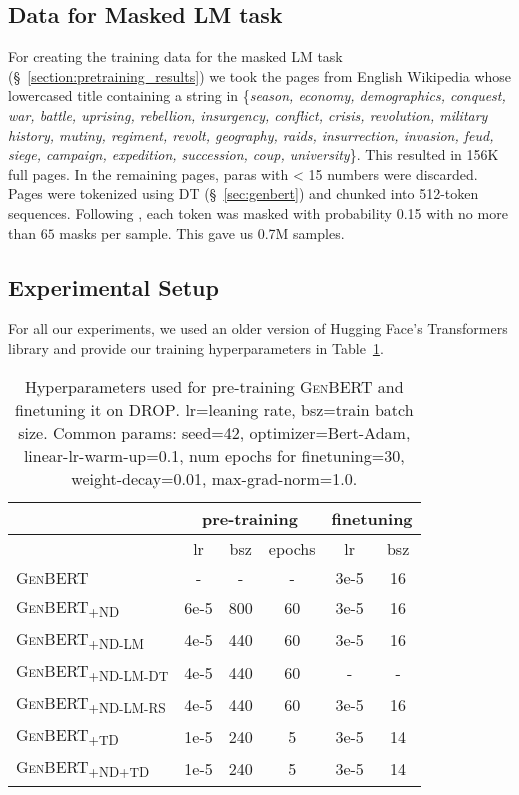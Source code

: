 \documentclass[11pt,a4paper]{article}
\newcommand\ssc[1]{\textsubscript{\textsc{#1}}}
\newcommand\genbert{\textsc{GenBERT}}
\newcommand\drop{\textsc{DROP}}
\begin{document}
\subsection{Data for Masked LM task}\label{sec:mlm_data}
For creating the training data for the masked LM task (\S~\ref{section:pretraining_results}) we took the pages from English Wikipedia whose lowercased title containing a string in \{\textit{season, economy, demographics, conquest, war, battle, uprising, rebellion, insurgency, conflict, crisis, revolution, military history, mutiny, regiment, revolt, geography, raids, insurrection, invasion, feud, siege, campaign, expedition, succession, coup, university}\}. This resulted in 156K full pages. In the remaining pages, paras with < 15 numbers were discarded. Pages were tokenized using DT (\S~\ref{sec:genbert}) and chunked into 512-token sequences. Following \citet{devlin2018bert}, each token was masked with probability 0.15 with no more than $65$ masks per sample. This gave us 0.7M samples.



\subsection{Experimental Setup}\label{sec:exp_setup}
For all our experiments, we used an older version of Hugging Face's Transformers library \cite{Wolf2019HuggingFacesTS} and provide our training hyperparameters in Table~\ref{table:hyperparams}.
\begin{table}[t]\setlength{\belowcaptionskip}{-5pt}
    \scriptsize
    \centering
    \begin{tabular}{l|c|c|c|c|c|}
         & \multicolumn{3}{c|}{pre-training} & \multicolumn{2}{c|}{finetuning} \\
         \hline
         & lr & bsz & epochs & lr & bsz \\ \hline
         \textsc{GenBERT} & - & - & - & 3e-5 & 16 \\
         \textsc{GenBERT\ssc{+ND}} & 6e-5 & 800 & 60 & 3e-5 & 16 \\
         \textsc{GenBERT\ssc{+ND-LM}} & 4e-5 & 440 & 60 & 3e-5 & 16 \\
         \textsc{GenBERT\ssc{+ND-LM-DT}} & 4e-5 & 440 & 60 & - & - \\
         \textsc{GenBERT\ssc{+ND-LM-RS}} & 4e-5 & 440 & 60 & 3e-5 & 16 \\
         \textsc{GenBERT\ssc{+TD}} & 1e-5 & 240 & 5 & 3e-5 & 14 \\
         \textsc{GenBERT\ssc{+ND+TD}} & 1e-5 & 240 & 5 & 3e-5 & 14 \\
    \end{tabular}
    \caption{Hyperparameters used for pre-training \genbert{} and finetuning it on \drop{}. lr=leaning rate, bsz=train batch size. Common params: seed=42, optimizer=Bert-Adam, linear-lr-warm-up=0.1, num epochs for finetuning=30, weight-decay=0.01, max-grad-norm=1.0.}
    \label{table:hyperparams}
\end{table}
\end{document}
